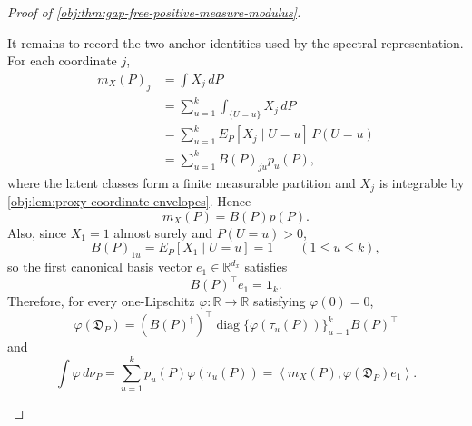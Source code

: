 \documentclass[11pt]{article}
\begin{document}
\begin{proof}[Proof of \cref{obj:thm:gap-free-positive-measure-modulus}]
\begin{enumerate}
It remains to record the two anchor identities used by the spectral representation.  For each coordinate \(j\),
\[
\begin{aligned}
m_X(P)_j
&=\int X_j\,dP\\
&=\sum_{u=1}^k\int_{\{U=u\}}X_j\,dP\\
&=\sum_{u=1}^k E_P[X_j\mid U=u]\,P(U=u)\\
&=\sum_{u=1}^k B(P)_{ju}p_u(P),
\end{aligned}
\]
where the latent classes form a finite measurable partition and \(X_j\) is integrable by \cref{obj:lem:proxy-coordinate-envelopes}.  Hence
\[
m_X(P)=B(P)p(P).
\]
Also, since \(X_1=1\) almost surely and \(P(U=u)>0\),
\[
B(P)_{1u}=E_P[X_1\mid U=u]=1
\qquad(1\le u\le k),
\]
so the first canonical basis vector \(e_1\in\mathbb R^{d_x}\) satisfies
\[
B(P)^\top e_1=\mathbf 1_k .
\]
Therefore, for every one-Lipschitz \(\varphi:\mathbb R\to\mathbb R\) satisfying
\(\varphi(0)=0\),
\[
\varphi(\mathfrak D_P)
=
(B(P)^\dagger)^\top
\operatorname{diag}\{\varphi(\tau_u(P))\}_{u=1}^kB(P)^\top
\]
and
\[
\int \varphi\,d\nu_P
=
\sum_{u=1}^kp_u(P)\varphi(\tau_u(P))
=
\left\langle m_X(P),\varphi(\mathfrak D_P)e_1\right\rangle .
\]


\end{enumerate}
\end{proof}
\end{document}
